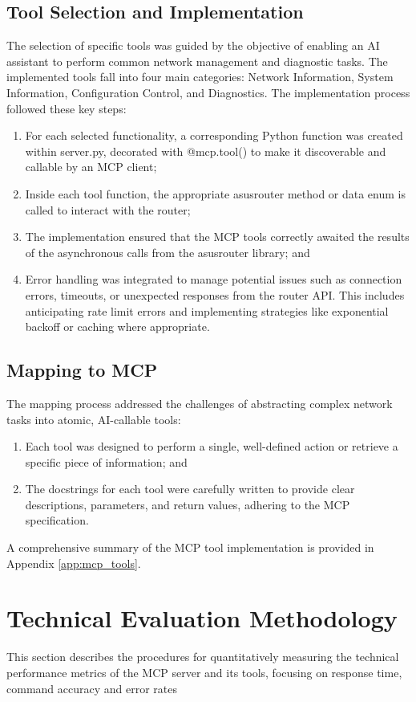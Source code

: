 \subsection{Tool Selection and Implementation}
The selection of specific tools was guided by the objective of enabling an AI assistant to perform common network management and diagnostic tasks. The implemented tools fall into four main categories: Network Information, System Information, Configuration Control, and Diagnostics.
The implementation process followed these key steps:
\begin{enumerate}
\item For each selected functionality, a corresponding Python function was created within server.py, decorated with @mcp.tool() to make it discoverable and callable by an MCP client;
\item Inside each tool function, the appropriate asusrouter method or data enum is called to interact with the router;
\item The implementation ensured that the MCP tools correctly awaited the results of the asynchronous calls from the asusrouter library; and
\item Error handling was integrated to manage potential issues such as connection errors, timeouts, or unexpected responses from the router API. This includes anticipating rate limit errors and implementing strategies like exponential backoff or caching where appropriate.
\end{enumerate}
\subsection{Mapping to MCP}
The mapping process addressed the challenges of abstracting complex network tasks into atomic, AI-callable tools:
\begin{enumerate}
\item Each tool was designed to perform a single, well-defined action or retrieve a specific piece of information; and
\item The docstrings for each tool were carefully written to provide clear descriptions, parameters, and return values, adhering to the MCP specification.
\end{enumerate}
A comprehensive summary of the MCP tool implementation is provided in Appendix \ref{app:mcp_tools}.
\section{Technical Evaluation Methodology}
This section describes the procedures for quantitatively measuring the technical performance metrics of the MCP server and its tools, focusing on response time, command accuracy and error rates
